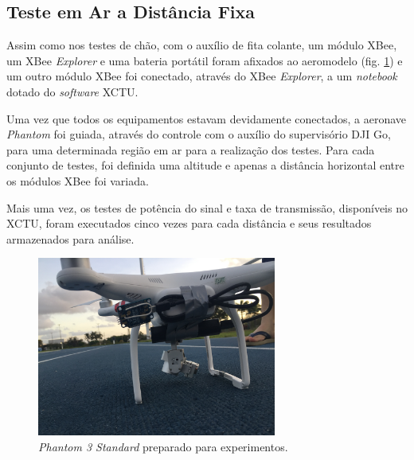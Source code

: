 \subsection{Teste em Ar a Distância Fixa}

Assim como nos testes de chão, com o auxílio de fita colante, um módulo XBee, um XBee \emph{Explorer} e uma bateria portátil foram afixados ao aeromodelo (fig. \ref{fig:conjExp}) e um outro módulo XBee foi conectado, através do XBee \emph{Explorer}, a um \emph{notebook} dotado do \emph{software} XCTU. 

Uma vez que todos os equipamentos estavam devidamente conectados, a aeronave \emph{Phantom} foi guiada, através do controle com o auxílio do supervisório DJI Go, para uma determinada região em ar para a realização dos testes. Para cada conjunto de testes, foi definida uma altitude e apenas a distância horizontal entre os módulos XBee foi variada.

Mais uma vez, os testes de potência do sinal e taxa de transmissão, disponíveis no XCTU, foram executados cinco vezes para cada distância e seus resultados armazenados para análise. 

\begin{figure} 
\center
\includegraphics[width=0.7\textwidth]{conjExp.jpg}
\caption{\emph{Phantom 3 Standard} preparado para experimentos.} 
\label{fig:conjExp}
\end{figure}